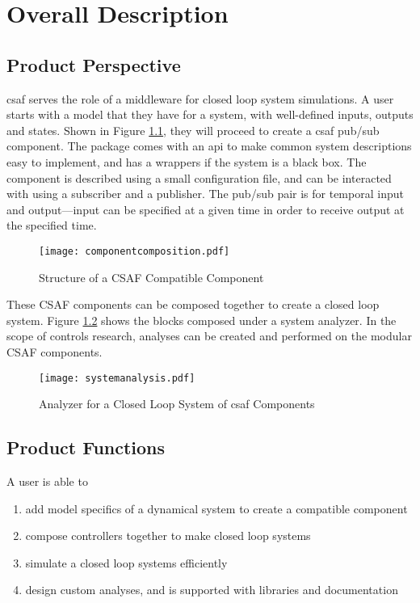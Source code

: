 \chapter{Overall Description}

\section{Product Perspective}

\acrshort{csaf} serves the role of a middleware for closed loop system simulations. A user starts with a model that they have for a system, with well-defined inputs, outputs and states. Shown in Figure \ref{fig:ccomp}, they will proceed to create a \acrshort{csaf} pub/sub component. The package comes with an \acrshort{api} to make common system descriptions easy to implement, and has a wrappers if the system is a black box. 
The component is described using a small configuration file, and can be interacted with using a subscriber and a publisher. The pub/sub pair is for temporal input and output---input can be specified at a given time in order to receive output at the specified time. \\

\begin{figure}
\centering
\texttt{[image: componentcomposition.pdf]}
\caption{Structure of a CSAF Compatible Component}
\label{fig:ccomp}
\end{figure}

These CSAF components can be composed together to create a closed loop system. Figure \ref{fig:csys} shows the blocks composed under a system analyzer. In the scope of controls research, analyses can be created and performed on the modular CSAF components. \\

\begin{figure}
\centering
\texttt{[image: systemanalysis.pdf]}
\caption{Analyzer for a Closed Loop System of \acrshort{csaf} Components }
\label{fig:csys}
\end{figure}


\section{Product Functions}

A user is able to

\begin{enumerate}
\item add model specifics of a dynamical system to create a compatible component
\item compose controllers together to make closed loop systems
\item simulate a closed loop systems efficiently
\item design custom analyses, and is supported with libraries and documentation
\end{enumerate}

